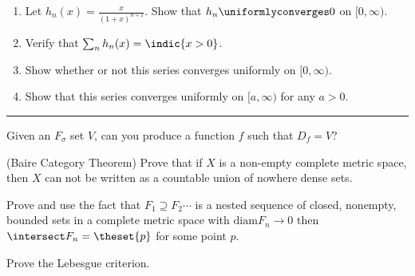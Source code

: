 \begin{problem}
\begin{enumerate}
  \item Let $h_n(x) = \frac x {(1+x)^{n+1}}$. Show that $h_n \uniformlyconverges 0$ on $[0, \infty)$.
  \item Verify that $\sum_n h_n(x) = \indic{x > 0}$.
  \item Show whether or not this series converges uniformly on $[0, \infty)$.
  \item Show that this series converges uniformly on $[a, \infty)$ for any $a>0$.
\end{enumerate}
\end{problem}

\vspace{2em}\hrule

\begin{problem}
  Given an $F_\sigma$ set $V$, can you produce a function $f$ such that $D_f = V$?
\end{problem}

\begin{problem}
  (Baire Category Theorem) Prove that if $X$ is a non-empty complete metric space, then $X$ can not be written as a countable union of nowhere dense sets.

  Prove and use the fact that $F_1 \supseteq F_2 \cdots$ is a nested sequence of closed, nonempty, bounded sets in a complete metric space with $\mathrm{diam} F_n  \to 0$ then $\intersect F_n = \theset{p}$ for some point $p$.
\end{problem}

\begin{problem}
  Prove the Lebesgue criterion.
\end{problem}
